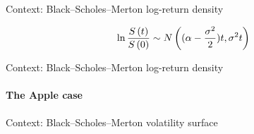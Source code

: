 \documentclass{beamer}
\newcommand{\St}{S\left(t\right)}
\newcommand{\BSM}{Black--Scholes--Merton }
\begin{document}
\begin{frame}{Context: \BSM log-return density}

\begin{center}
\begin{equation}
\ln{\frac{\St}{S\left(0\right)}} 
  \sim N\left((\alpha - \frac{\sigma^2}{2}) t, \sigma^2 t \right)
\notag
\end{equation}
\end{center}  


\begin{figure}[!h]
\centering

\end{figure}
 
\end{frame}

\begin{frame}{Context: \BSM log-return density}
\framesubtitle{The Apple case}

\begin{figure}[!h]
\centering

\end{figure}
 
\end{frame}



\begin{frame}{Context: \BSM volatility surface}

  \begin{figure}[h]
  \centering
  
\end{figure}

\end{frame}
\end{document}
